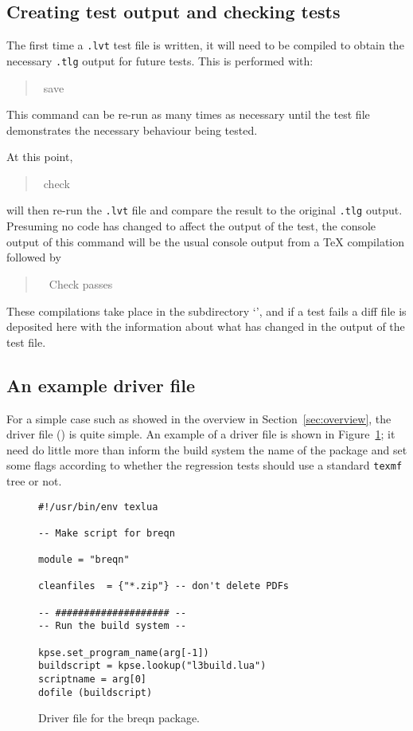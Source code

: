 \documentclass[a4paper]{ltugboat}
\begin{document}
\subsection{Creating test output and checking tests}

The first time a \texttt{.lvt} test file is written, it will need to be compiled to obtain the necessary \texttt{.tlg} output for future tests.
This is performed with:
\begin{quote}\ttfamily
\execname~save~
\end{quote}
This command can be re-run as many times as necessary until the test file demonstrates the necessary behaviour being tested.

At this point, 
\begin{quote}\ttfamily
\execname~check~
\end{quote}
will then re-run the \texttt{.lvt} file and compare the result to the original \texttt{.tlg} output.
Presuming no code has changed to affect the output of the test, the console output of this command will be the usual console output from a \TeX{} compilation followed by
\begin{quote}\ttfamily
~~Check passes
\end{quote}
These compilations take place in the subdirectory `\texttt{\compdirname}', and if a test fails a diff file is deposited here with the information about what has changed in the output of the test file.

\subsection{An example driver file}
\label{sec:example}

For a simple case such as showed in the overview in Section~\ref{sec:overview}, the driver file (\texttt{\drivername}) is quite simple.
An example of a driver file is shown in Figure~\ref{fig:driver}; it need do little more than inform the build system the name of the package and set some flags according to whether the regression tests should use a standard \texttt{texmf} tree or not.

\begin{figure}
\begin{Verbatim}[frame=single,fontsize=\small]
#!/usr/bin/env texlua

-- Make script for breqn

module = "breqn"

cleanfiles  = {"*.zip"} -- don't delete PDFs

-- #################### --
-- Run the build system --

kpse.set_program_name(arg[-1])
buildscript = kpse.lookup("l3build.lua")
scriptname = arg[0]
dofile (buildscript)
\end{Verbatim}
\caption{Driver file for the \textsf{breqn} package.}
\label{fig:driver}
\end{figure}
\end{document}
